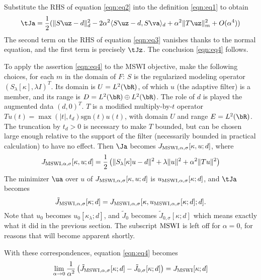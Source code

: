 Substitute the RHS of equation \ref{eqn:eq2} into the definition \ref{eqn:eq1} to obtain
\begin{equation}
  \label{eqn:eq3}
  \tJa = \frac{1}{2}(\|S\uz-d\|_d^2 - 2 \alpha^2\langle S\uz-d, S\va\rangle_d + \alpha^2\|T\uz\|_m^2 + O(\alpha^4))
\end{equation}
The second term on the RHS of equation \ref{eqn:eq3} vanishes thanks to the normal equation, and the first term is precisely $\tJz$. The conclusion \ref{eqn:eq4} follows.

To apply the assertion \ref{eqn:eq4} to the MSWI objective, make the
following choices, for each $m$ in the domain of $F$: $S$ is the regularized
modeling operator $(S_{\lambda}[\kappa],\lambda I)^T$.  Its domain is $U=L^2(\bR)$, of
which $u$ (the adaptive filter) is a member, and 
its range is $D = L^2(\bR) \oplus
L^2(\bR)$. The role of $d$ is played  the
augmented data $(d,0)^T$. $T$ is a modified multiply-by-$t$ operator
$Tu(t)=\max(|t|, t_d) \mbox{sgn}(t)u(t)$, with domain $U$ and
range $E=L^2(\bR)$. The truncation by $t_d > 0$ is necessary
to make $T$ bounded, but can be chosen large enough relative to the
support of the filter (necessarily bounded in practical calculation)
to have no effect. Then $\Ja$ becomes $J_{{\rm MSWI},\alpha,\sigma}[\kappa,u;d]$, where
\begin{equation}
  \label{eqn:eq5}
   J_{{\rm MSWI},\alpha,\sigma}[\kappa,u;d] = \frac{1}{2}\left(\|S_{\lambda}[\kappa]u-d\|^2 +
   \lambda\|u\|^2 + \alpha^2\|Tu\|^2\right)
 \end{equation}
The minimizer $\ua$ over $u$ of $ J_{{\rm MSWI}, \alpha,\sigma}[\kappa,u;d]$ is
$u_{{\rm MSWI},\alpha,\sigma}[\kappa;d]$, and $\tJa$ becomes
\begin{equation}
  \label{eqn:eq6}
  \tilde{J}_{{\rm MSWI},\alpha,\sigma}[\kappa;d] =
  J_{{\rm MSWI},\alpha,\sigma}[\kappa,u_{{\rm MSWI},\alpha,\sigma}[\kappa;d];d].
\end{equation}
Note that $u_0$ becomes $u_0[\kappa_{\lambda};d]$, and $\tilde{J}_0$ becomes
$\tilde{J}_{0,\sigma}[\kappa;d]$ which means exactly what
it did in the previous section. The subscript ${\rm MSWI}$ is left
off for $\alpha=0$, for reasons that will become apparent shortly.

With these correspondences, equation \ref{eqn:eq4} becomes
\begin{equation}
  \label{eqn:eq7}
  \lim_{\alpha \rightarrow 0}
  \frac{1}{\alpha^2}\left(\tilde{J}_{{\rm MSWI},\alpha,\sigma}[\kappa;d]-\tilde{J}_{0,\sigma}[\kappa;d]\right)=
  J_{\rm MSWI}[\kappa;d]
\end{equation}

